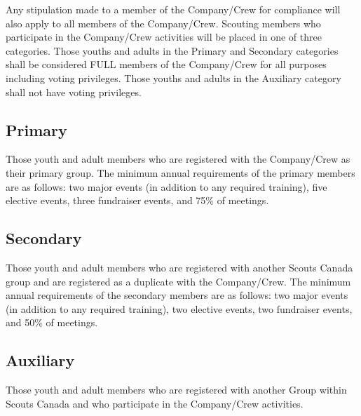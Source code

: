 Any stipulation made to a member of the Company/Crew for compliance will also apply to all members of the Company/Crew.
Scouting members who participate in the Company/Crew activities will be placed in one of three categories.
Those youths and adults in the Primary and Secondary categories shall be considered FULL members of the Company/Crew for all purposes including voting privileges.
Those youths and adults in the Auxiliary category shall not have voting privileges.

\subsection{Primary}\label{subsec:primary}
Those youth and adult members who are registered with the Company/Crew as their primary group.
The minimum annual requirements of the primary members are as follows: two major events (in addition to any required training), five elective events, three fundraiser events, and 75\% of meetings.

\subsection{Secondary}\label{subsec:secondary}
Those youth and adult members who are registered with another Scouts Canada group and are registered as a duplicate with the Company/Crew.
The minimum annual requirements of the secondary members are as follows: two major events (in addition to any required training), two elective events, two fundraiser events, and 50\% of meetings.

\subsection{Auxiliary}\label{subsec:auxiliary}
Those youth and adult members who are registered with another Group within Scouts Canada and who participate in the Company/Crew activities.